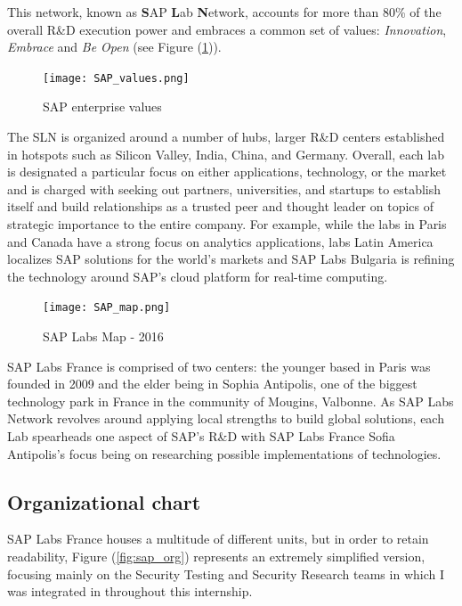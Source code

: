 \documentclass[11pt]{article}
\begin{document}
\vspace{3mm}
This network, known as \textbf{S}AP \textbf{L}ab \textbf{N}etwork, accounts for more than 80\% of the overall R\&D execution power and embraces a common set of values: \textit{Innovation}, \textit{Embrace} and \textit{Be Open} (see Figure (\ref{fig:SAP_values})).

\begin{figure}[h]
    \centering
    \texttt{[image: SAP\_values.png]}
    \caption{SAP enterprise values}
    \label{fig:SAP_values}
\end{figure}

The SLN is organized around a number of hubs, larger R\&D centers established in hotspots such as Silicon Valley, India, China, and Germany. Overall, each lab is designated a particular focus on either applications, technology, or the market and is charged with seeking out partners, universities, and startups to establish itself and build relationships as a trusted peer and thought leader on topics of strategic importance to the entire company. For example, while the labs in Paris and Canada have a strong focus on analytics applications, labs Latin America localizes SAP solutions for the world’s markets and SAP Labs Bulgaria is refining the technology around SAP’s cloud platform for real-time computing.

\begin{figure}[h]
    \centering
    \texttt{[image: SAP\_map.png]}
    \caption{SAP Labs Map - 2016}
    \label{fig:sap_map}
\end{figure}

\vspace{3mm}
SAP Labs France is comprised of two centers: the younger based in Paris was founded in 2009 and the elder being in Sophia Antipolis, one of the biggest technology park in France in the community of Mougins, Valbonne. As SAP Labs Network revolves around applying local strengths to build global solutions, each Lab spearheads one aspect of SAP's R\&D with SAP Labs France Sofia Antipolis's focus being on researching possible implementations of technologies.

\vspace{4mm}
\subsection{Organizational chart}

\hspace{5mm} SAP Labs France houses a multitude of different units, but in order to retain readability, Figure (\ref{fig:sap_org}) represents an extremely simplified version, focusing mainly on the Security Testing and Security Research teams in which I was integrated in throughout this internship. 
\end{document}
